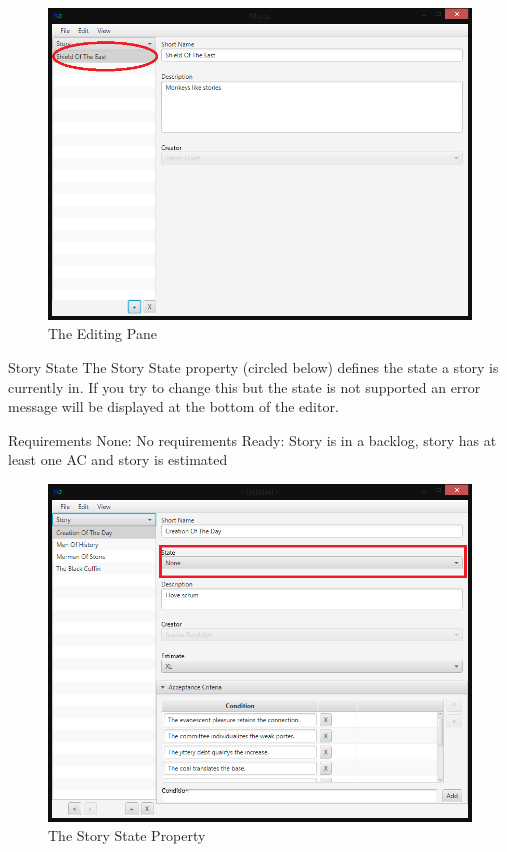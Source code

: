 \begin{figure}[H]
\centering
\includegraphics[width=\textwidth]{images/screenshots/stories4.PNG}
\caption{The Editing Pane}
\label{fig:new_project}
\end{figure}

Story State\newline
The Story State property (circled below) defines the state a story is currently in. If you try to change this but the state is not supported an error message will be displayed at the bottom of the editor. \newline

Requirements\newline
None: No requirements\newline
Ready: Story is in a backlog, story has at least one AC and story is estimated

\begin{figure}[H]
\centering
\includegraphics[width=\textwidth]{images/screenshots/Readiness1.PNG}
\caption{The Story State Property}
\label{fig:new_project}
\end{figure}

